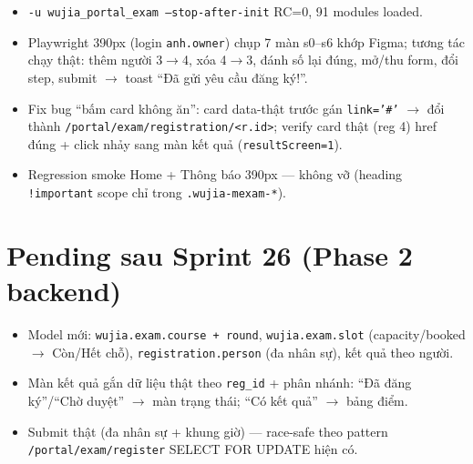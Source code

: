 \begin{itemize}
  \item \texttt{-u wujia\_portal\_exam --stop-after-init} RC=0, 91 modules loaded.
  \item Playwright 390px (login \texttt{anh.owner}) chụp 7 màn s0--s6 khớp Figma; tương tác chạy thật: thêm người 3$\rightarrow$4, xóa 4$\rightarrow$3, đánh số lại đúng, mở/thu form, đổi step, submit $\rightarrow$ toast ``Đã gửi yêu cầu đăng ký!''.
  \item Fix bug ``bấm card không ăn'': card data-thật trước gán \texttt{link='\#'} $\rightarrow$ đổi thành \texttt{/portal/exam/registration/<r.id>}; verify card thật (reg 4) href đúng + click nhảy sang màn kết quả (\texttt{resultScreen=1}).
  \item Regression smoke Home + Thông báo 390px --- không vỡ (heading \texttt{!important} scope chỉ trong \texttt{.wujia-mexam-*}).
\end{itemize}

\section{Pending sau Sprint 26 (Phase 2 backend)}

\begin{itemize}
  \item Model mới: \texttt{wujia.exam.course + round}, \texttt{wujia.exam.slot} (capacity/booked $\rightarrow$ Còn/Hết chỗ), \texttt{registration.person} (đa nhân sự), kết quả theo người.
  \item Màn kết quả gắn dữ liệu thật theo \texttt{reg\_id} + phân nhánh: ``Đã đăng ký''/``Chờ duyệt'' $\rightarrow$ màn trạng thái; ``Có kết quả'' $\rightarrow$ bảng điểm.
  \item Submit thật (đa nhân sự + khung giờ) --- race-safe theo pattern \texttt{/portal/exam/register} SELECT FOR UPDATE hiện có.
\end{itemize}
